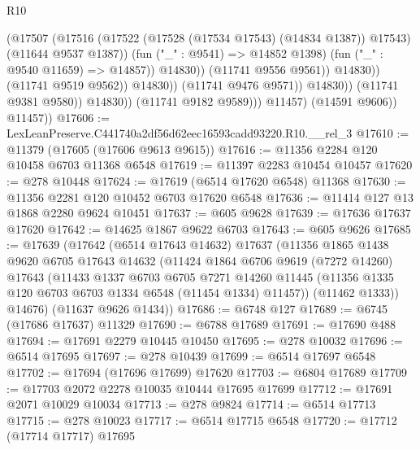 \begin{lexlean}{R10}
\begin{coremodule}
                                            (@17507
                                              (@17516
                                                (@17522
                                                  (@17528 (@17534 @17543) (@14834 @1387))
                                                  @17543)
                                                (@11644 @9537 @1387))
                                              (fun ("_" : @9541) => @14852 @1398)
                                              (fun ("_" : @9540 @11659) => @14857))
                                            @14830))
                                        (@11741 @9556 @9561))
                                      @14830))
                                  (@11741 @9519 @9562))
                                @14830))
                            (@11741 @9476 @9571))
                          @14830))
                      (@11741 @9381 @9580))
                    @14830))
                (@11741 @9182 @9589)))
            @11457)
          (@14591 @9606))
        @11457))
@17606 := LexLeanPreserve.C441740a2df56d62eec16593cadd93220.R10.__rel_3
@17610 := @11379 (@17605 (@17606 @9613 @9615))
@17616 := @11356 @2284 @120 @10458 @6703 @11368 @6548
@17619 := @11397 @2283 @10454 @10457
@17620 := @278 @10448
@17624 := @17619 (@6514 @17620 @6548) @11368
@17630 := @11356 @2281 @120 @10452 @6703 @17620 @6548
@17636 := @11414 @127 @13 @1868 @2280 @9624 @10451
@17637 := @605 @9628
@17639 := @17636 @17637 @17620
@17642 := @14625 @1867 @9622 @6703
@17643 := @605 @9626
@17685 := @17639
    (@17642
      (@6514 @17643 @14632)
      @17637
      (@11356
        @1865
        @1438
        @9620
        @6705
        @17643
        @14632
        (@11424
          @1864
          @6706
          @9619
          (@7272 @14260)
          @17643
          (@11433
            @1337
            @6703
            @6705
            @7271
            @14260
            @11445
            (@11356 @1335 @120 @6703 @6703 @1334 @6548 (@11454 @1334) @11457))
          (@11462 @1333))
        @14676)
      (@11637 @9626 @1434))
@17686 := @6748 @127
@17689 := @6745 (@17686 @17637) @11329
@17690 := @6788 @17689
@17691 := @17690 @488
@17694 := @17691 @2279 @10445 @10450
@17695 := @278 @10032
@17696 := @6514 @17695
@17697 := @278 @10439
@17699 := @6514 @17697 @6548
@17702 := @17694 (@17696 @17699) @17620
@17703 := @6804 @17689
@17709 := @17703 @2072 @2278 @10035 @10444 @17695 @17699
@17712 := @17691 @2071 @10029 @10034
@17713 := @278 @9824
@17714 := @6514 @17713
@17715 := @278 @10023
@17717 := @6514 @17715 @6548
@17720 := @17712 (@17714 @17717) @17695

\end{coremodule}
\end{lexlean}
